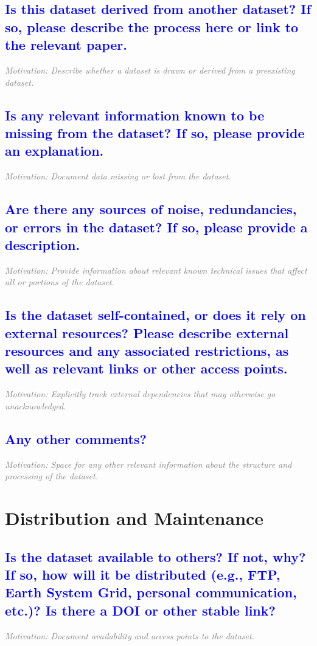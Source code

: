 \documentclass[letterpaper, 10 pt, transmag]{IEEEtran}
\begin{document}
\textcolor{blue}{\subsection{Is this dataset derived from another dataset? If so, please describe the process here or link to the relevant paper.}} 
\textcolor{gray}{\textit{Motivation: Describe whether a dataset is drawn or derived from a preexisting dataset.}}

\textcolor{blue}{\subsection{Is any relevant information known to be missing from the dataset? If so, please provide an explanation.}}
\textcolor{gray}{\textit{Motivation: Document data missing or lost from the dataset.}}

\textcolor{blue}{\subsection{Are there any sources of noise, redundancies, or errors in the dataset? If so, please provide a description.}}
\textcolor{gray}{\textit{Motivation: Provide information about relevant known technical issues that affect all or portions of the dataset.}}

\textcolor{blue}{\subsection{Is the dataset self-contained, or does it rely on external resources? Please describe external resources and any associated restrictions, as well as relevant links or other access points.}}
\textcolor{gray}{\textit{Motivation: Explicitly track external dependencies that may otherwise go unacknowledged.}}

\textcolor{blue}{\subsection{Any other comments?}}
\textcolor{gray}{\textit{Motivation: Space for any other relevant information about the structure and processing of the dataset.}}  
\vspace{10mm}

\section{Distribution and Maintenance}

\textcolor{blue}{\subsection{Is the dataset available to others? If not, why? If so, how will it be distributed (e.g., FTP, Earth System Grid, personal communication, etc.)? Is there a DOI or other stable link?}}
\textcolor{gray}{\textit{Motivation: Document availability and access points to the dataset.}}
\end{document}

